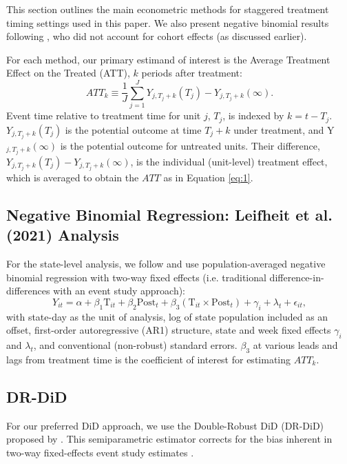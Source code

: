 \documentclass[12pt]{amsart}
\begin{document}
This section outlines the main econometric methods for staggered treatment timing settings used in this paper. We also present  negative binomial results following , who did not account for cohort effects (as discussed earlier). 

For each method, our primary estimand of interest is the Average Treatment Effect on the Treated (ATT), $k$ periods after treatment:
\begin{equation}\label{eq:1}
    ATT_k \equiv \frac{1}{J} \sum_{j=1}^{J} Y_{j,T_j + k}(T_j) - Y_{j,T_j + k}(\infty).
\end{equation}
Event time relative to treatment time for unit $j$, $T_j$, is indexed by $k = t - T_j$. $Y_{j,T_j + k}(T_j)$ is the potential outcome at time $T_j + k$ under treatment, and Y$_{j,T_j + k}(\infty)$ is the potential outcome for untreated units. Their difference, $Y_{j,T_j + k}(T_j) - Y_{j,T_j + k}(\infty)$, is the individual (unit-level) treatment effect, which is averaged to obtain the $ATT$ as in Equation \eqref{eq:1}. 

\subsection{Negative Binomial Regression: Leifheit et al. (2021) Analysis}

For the state-level analysis, we follow  and use population-averaged negative binomial regression with two-way fixed effects (i.e. traditional difference-in-differences with an event study approach):
\begin{equation}
    Y_{it} = \alpha + \beta_1 \text{{T}}_{it} + \beta_2 \text{{Post}}_t + \beta_3 (\text{{T}}_{it} \times \text{{Post}}_t) + \gamma_i + \lambda_t + \epsilon_{it},
\end{equation}
with state-day as the unit of analysis, log of state population included as an offset, first-order autoregressive (AR1) structure, state and week fixed effects $\gamma_i$ and $\lambda_t$, and conventional (non-robust) standard errors. $\beta_3$ at various leads and lags from treatment time is the coefficient of interest for estimating $ATT_k$. 

\subsection{DR-DiD}

For our preferred DiD approach, we use the Double-Robust DiD (DR-DiD) proposed by . This semiparametric estimator corrects for the bias inherent in two-way fixed-effects event study estimates \cite{GOODMAN-BACON_MARCUS:2020}. 
\end{document}

